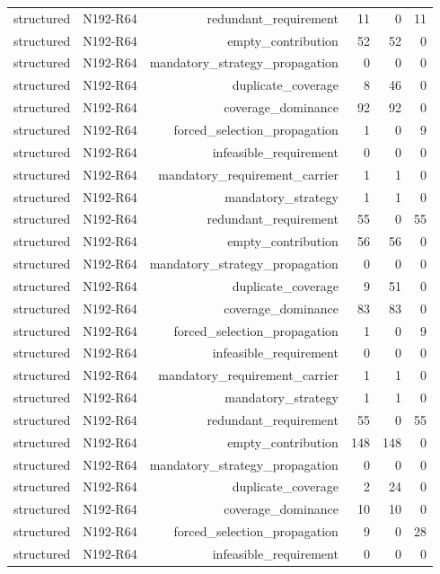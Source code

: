 {\begin{longtable}{lrrrrr}
structured & N192-R64 & redundant\_requirement & 11 & 0 & 11 \\
structured & N192-R64 & empty\_contribution & 52 & 52 & 0 \\
structured & N192-R64 & mandatory\_strategy\_propagation & 0 & 0 & 0 \\
structured & N192-R64 & duplicate\_coverage & 8 & 46 & 0 \\
structured & N192-R64 & coverage\_dominance & 92 & 92 & 0 \\
structured & N192-R64 & forced\_selection\_propagation & 1 & 0 & 9 \\
structured & N192-R64 & infeasible\_requirement & 0 & 0 & 0 \\
structured & N192-R64 & mandatory\_requirement\_carrier & 1 & 1 & 0 \\
structured & N192-R64 & mandatory\_strategy & 1 & 1 & 0 \\
structured & N192-R64 & redundant\_requirement & 55 & 0 & 55 \\
structured & N192-R64 & empty\_contribution & 56 & 56 & 0 \\
structured & N192-R64 & mandatory\_strategy\_propagation & 0 & 0 & 0 \\
structured & N192-R64 & duplicate\_coverage & 9 & 51 & 0 \\
structured & N192-R64 & coverage\_dominance & 83 & 83 & 0 \\
structured & N192-R64 & forced\_selection\_propagation & 1 & 0 & 9 \\
structured & N192-R64 & infeasible\_requirement & 0 & 0 & 0 \\
structured & N192-R64 & mandatory\_requirement\_carrier & 1 & 1 & 0 \\
structured & N192-R64 & mandatory\_strategy & 1 & 1 & 0 \\
structured & N192-R64 & redundant\_requirement & 55 & 0 & 55 \\
structured & N192-R64 & empty\_contribution & 148 & 148 & 0 \\
structured & N192-R64 & mandatory\_strategy\_propagation & 0 & 0 & 0 \\
structured & N192-R64 & duplicate\_coverage & 2 & 24 & 0 \\
structured & N192-R64 & coverage\_dominance & 10 & 10 & 0 \\
structured & N192-R64 & forced\_selection\_propagation & 9 & 0 & 28 \\
structured & N192-R64 & infeasible\_requirement & 0 & 0 & 0 \\

\end{longtable}}
